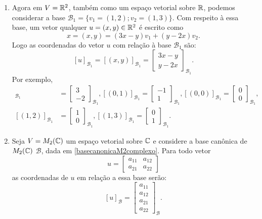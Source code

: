 \begin{exemplos}
\begin{enumerate}
    \item Agora em $V = \mathbb{R}^2$, também como um espaço vetorial sobre $\mathbb{R}$, podemos considerar a base $\mathcal{B}_1 = \{v_1 = (1, 2); v_2 = (1, 3)\}$. Com respeito à essa base, um vetor qualquer $u = (x, y) \in \mathbb{R}^2$ é escrito como
      \[
        x = (x, y) = (3x - y)v_1 + (y - 2x)v_2.
      \]
      Logo as coordenadas do vetor $u$ com relação à base $\mathcal{B}_1$ são:
      \[
        [u]_{\mathcal{B}_1} = [(x, y)]_{\mathcal{B}_1} = \begin{bmatrix}3x - y\\y - 2x\end{bmatrix}_{\mathcal{B}_1}.
      \]
      Por exemplo,
      \begin{align*}
        [(1, 0)]_{\mathcal{B}_1} &= \begin{bmatrix}3\\-2\end{bmatrix}_{\mathcal{B}_1},
        [(0, 1)]_{\mathcal{B}_1} = \begin{bmatrix}-1\\1\end{bmatrix}_{\mathcal{B}_1},
        [(0, 0)]_{\mathcal{B}_1} = \begin{bmatrix}0\\0\end{bmatrix}_{\mathcal{B}_1},\\
        [(1, 2)]_{\mathcal{B}_1} &= \begin{bmatrix}1\\0\end{bmatrix}_{\mathcal{B}_1},
        [(1, 3)]_{\mathcal{B}_1} = \begin{bmatrix}0\\1\end{bmatrix}_{\mathcal{B}_1}.
      \end{align*}

    \item Seja $V = M_2(\mathbb{C})$ um espaço vetorial sobre $\mathbb{C}$ e considere a base canônica de $M_2(\mathbb{C})$ $\mathcal{B}$, dada em \ref{basecanonicaM2complexo}. Para todo vetor
      \[
        u = \begin{bmatrix}
          a_{11} & a_{12}\\
          a_{21} & a_{22}
        \end{bmatrix}
      \]
      as coordenadas de $u$ em relação a essa base serão:
      \[
        [u]_\mathcal{B} = \begin{bmatrix}a_{11}\\a_{12}\\a_{21}\\a_{22}\end{bmatrix}_\mathcal{B}.
      \]
  \end{enumerate}
\end{exemplos}
